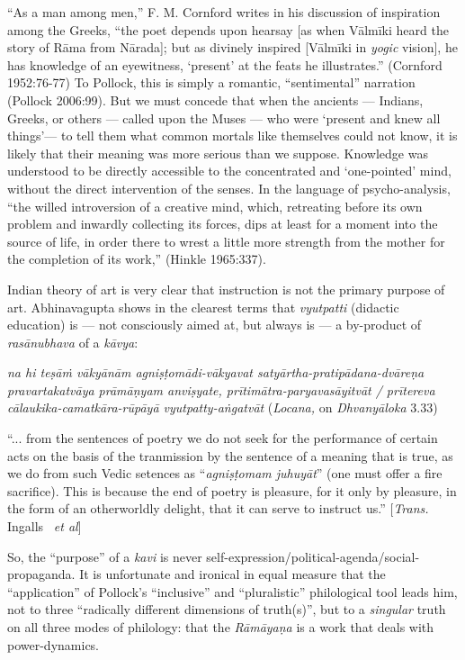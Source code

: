 “As a man among men,” F. M. Cornford writes in his discussion of inspiration among the Greeks, “the poet depends upon hearsay [as when Vālmīki heard the story of Rāma from Nārada]; but as divinely inspired [Vālmīki in {\sl yogic} vision], he has knowledge of an eyewitness, ‘present’ at the feats he illustrates.” (Cornford 1952:76-77) To Pollock, this is simply a romantic, “sentimental” narration (Pollock 2006:99). But we must concede that when the ancients — Indians, Greeks, or others — called upon the Muses — who were ‘present and knew all things’— to tell them what common mortals like themselves could not know, it is likely that their meaning was more serious than we suppose. Knowledge was understood to be directly accessible to the concentrated and ‘one-pointed’ mind, without the direct intervention of the senses. In the language of psycho-analysis,  “the willed introversion of a creative mind, which, retreating before its own problem and inwardly collecting its forces, dips at least for a moment into the source of life, in order there to wrest a little more strength from the mother for the completion of its work,” (Hinkle 1965:337). 

Indian theory of art is very clear that instruction is not the primary purpose of art. Abhinavagupta shows in the clearest terms that {\sl vyutpatti} (didactic education) is — not consciously aimed at, but always is — a by-product of {\sl rasānubhava} of a {\sl kāvya}:

\begin{myquote}
{{\sl na hi teṣāṁ vākyānām agniṣṭomādi-vākyavat satyārtha-pratipādana-dvāreṇa pravartakatvāya prāmāṇyam anviṣyate, prītimātra-paryavasāyitvāt / prītereva cālaukika-camatkāra-rūpāyā vyutpatty-aṅgatvāt}} ({\sl Locana,} on {\sl Dhvanyāloka} 3.33)

 “... from the sentences of poetry we do not seek for the performance of certain acts on the basis of the tranmission by the sentence of a meaning that is true, as we do from such Vedic setences as “{\sl agniṣṭomam juhuyāt}” (one must offer a fire sacrifice). This is because the end of poetry is pleasure, for it only by pleasure, in the form of an otherworldly delight, that it can serve to instruct us.”
\hfill  [{\sl Trans.} Ingalls~ {\sl et al}]
\end{myquote}

So, the “purpose” of a {\sl kavi} is never self-expression/political-agenda/\-social-propaganda. It is unfortunate and ironical in equal measure that the “application” of Pollock’s “inclusive” and “pluralistic” philological tool leads him, not to three “radically different dimensions of truth(s)”, but to a {\sl singular} truth on all three modes of philology: that the {\sl Rāmāyaṇa} is a work that deals with power-dynamics. 

